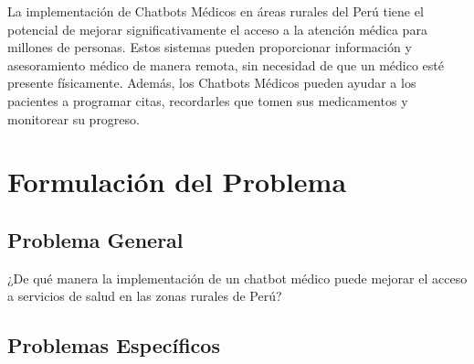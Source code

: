 La implementación de Chatbots Médicos en áreas rurales del Perú tiene el potencial de mejorar significativamente el acceso a la atención médica para millones de personas. Estos sistemas pueden proporcionar información y asesoramiento médico de manera remota, sin necesidad de que un médico esté presente físicamente. Además, los Chatbots Médicos pueden ayudar a los pacientes a programar citas, recordarles que tomen sus medicamentos y monitorear su progreso. 




\section{Formulación del Problema}




\subsection{Problema General}
\newcommand{\ProblemaGeneral}{
¿De qué manera la implementación de un chatbot médico puede mejorar el acceso a servicios de salud en las zonas rurales de Perú?
}
\ProblemaGeneral
\subsection{Problemas Espec\'{i}ficos}
\newcommand{\Pbone}{
¿Cuáles son los desafíos y las oportunidades para la implementación de chatbots médicos en áreas rurales?
}
\newcommand{\Pbtwo}{
¿Qué características y funcionalidades debe tener un chatbot médico para ser efectivo en áreas rurales?
}
\newcommand{\Pbthree}{
¿Qué estrategias se pueden utilizar para promover la adopción y el uso del chatbot médico entre las poblaciones rurales?
}
\newcommand{\Pbfour}{
¿Qué métricas se pueden utilizar para evaluar la efectividad del chatbot médico en la mejora del acceso a la atención médica y los resultados de salud en las poblaciones rurales?
}


